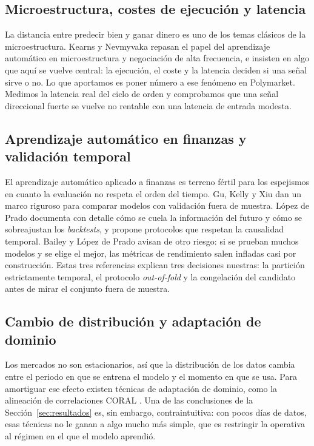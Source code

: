 \documentclass[11pt,a4paper]{article}
\begin{document}
\subsection{Microestructura, costes de ejecución y latencia}

La distancia entre predecir bien y ganar dinero es uno de los temas clásicos de la
microestructura. Kearns y Nevmyvaka \cite{kearns2013} repasan el papel del
aprendizaje automático en microestructura y negociación de alta frecuencia, e
insisten en algo que aquí se vuelve central: la ejecución, el coste y la latencia
deciden si una señal sirve o no. Lo que aportamos es poner número a ese fenómeno en
Polymarket. Medimos la latencia real del ciclo de orden y comprobamos que una señal
direccional fuerte se vuelve no rentable con una latencia de entrada modesta.

\subsection{Aprendizaje automático en finanzas y validación temporal}

El aprendizaje automático aplicado a finanzas es terreno fértil para los espejismos
en cuanto la evaluación no respeta el orden del tiempo. Gu, Kelly y Xiu
\cite{gu2020empirical} dan un marco riguroso para comparar modelos con validación
fuera de muestra. López de Prado \cite{lopezdeprado2018} documenta con detalle cómo
se cuela la información del futuro y cómo se sobreajustan los \emph{backtests}, y
propone protocolos que respetan la causalidad temporal. Bailey y López de Prado
\cite{bailey2014deflated} avisan de otro riesgo: si se prueban muchos modelos y se
elige el mejor, las métricas de rendimiento salen infladas casi por construcción.
Estas tres referencias explican tres decisiones nuestras: la partición estrictamente
temporal, el protocolo \emph{out-of-fold} y la congelación del candidato antes de
mirar el conjunto fuera de muestra.

\subsection{Cambio de distribución y adaptación de dominio}

Los mercados no son estacionarios, así que la distribución de los datos cambia
entre el periodo en que se entrena el modelo y el momento en que se usa. Para
amortiguar ese efecto existen técnicas de adaptación de dominio, como la alineación
de correlaciones CORAL \cite{sun2016coral}. Una de las conclusiones de la
Sección~\ref{sec:resultados} es, sin embargo, contraintuitiva: con pocos días de
datos, esas técnicas no le ganan a algo mucho más simple, que es restringir la
operativa al régimen en el que el modelo aprendió.
\end{document}
